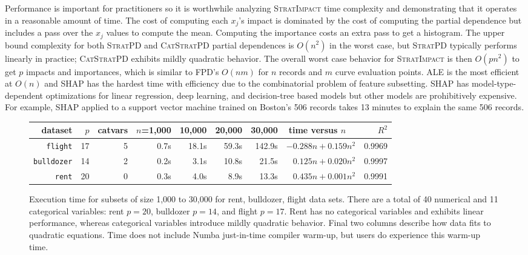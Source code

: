 \documentclass[11pt]{article}
\newcommand{\simp}{\fontfamily{cmr}\textsc{\small StratImpact}}
\newcommand{\spd}{\fontfamily{cmr}\textsc{\small StratPD}}
\newcommand{\cspd}{\fontfamily{cmr}\textsc{\small CatStratPD}}
\begin{document}
Performance is important for practitioners so it is worthwhile analyzing \simp{} time complexity and demonstrating that it operates in a reasonable amount of time.  The cost of computing each $x_j$'s impact is dominated by the cost of computing the partial dependence but includes a pass over the $x_j$ values to compute the mean. Computing the importance costs an extra pass to get a histogram. The upper bound  complexity for both \spd{} and \cspd{} partial dependences is $O(n^2)$ in the worst case, but \spd{} typically performs linearly in practice; \cspd{} exhibits mildly quadratic behavior.  The overall worst case behavior for \simp{} is then $O(p n^2)$ to get $p$ impacts and importances, which is  similar to FPD's $O(nm)$ for $n$ records and $m$ curve evaluation points.  ALE is the most efficient at $O(n)$ and SHAP has the hardest time with efficiency due to the combinatorial problem of feature subsetting. SHAP has model-type-dependent optimizations for linear regression, deep learning, and decision-tree based models but other models are prohibitively expensive. For example, SHAP applied to a support vector machine trained on Boston's 506 records takes 13 minutes to explain the same 506 records.

\begin{figure}\small
\centering
\begin{tabular}{r r r r r r r r r}
{\bf dataset} & $p$ & catvars & {\small $n$=1,000} & {\small 10,000} & {\small 20,000} & {\small 30,000} & time versus $n$~~ & $R^2$\\
\hline
{\tt\small flight} & 17 & 5 & 0.7s & 18.1s & 59.3s & 142.9s & {\small $-0.288 n + 0.159 n^2$} & {\small 0.9969}\\
{\tt\small bulldozer} & 14 & 2 & 0.2s & 3.1s & 10.8s & 21.5s & {\small $0.125 n + 0.020 n^2$} & {\small 0.9997}\\
{\tt\small rent} & 20 & 0 & 0.3s & 4.0s & 8.9s & 13.3s & {\small $0.435 n + 0.001 n^2$} & {\small 0.9991}\\
\end{tabular}
\caption{\small  Execution time for subsets of size 1,000 to 30,000 for rent, bulldozer, flight data sets.  There are a total of 40 numerical and 11 categorical variables: rent $p=20$, bulldozer $p=14$, and flight $p=17$. 
Rent has no categorical variables and exhibits linear performance, whereas categorical variables introduce mildly quadratic behavior. Final two columns describe how data fits to quadratic equations. Time does not include Numba just-in-time compiler warm-up, but users do experience this warm-up time.}
\label{fig:timing}
\end{figure}
\end{document}
